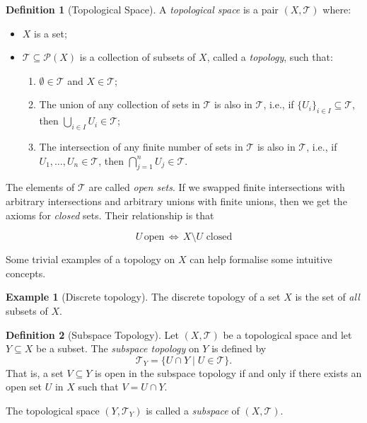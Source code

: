 \documentclass{article}
\theoremstyle{definition}
\newtheorem{definition}{Definition}[section]
\theoremstyle{definition}
\theoremstyle{definition}
\newtheorem{eg}{Example}[section]
\begin{document}
\begin{definition}[Topological Space] A \emph{topological space} is a pair \( (X, \mathcal{T}) \) where:
\begin{itemize}
    \item \( X \) is a set;
    \item \( \mathcal{T} \subseteq \mathcal{P}(X) \) is a collection of subsets of \( X \), called a \emph{topology}, such that:
    \begin{enumerate}
        \item \( \emptyset \in \mathcal{T} \) and \( X \in \mathcal{T} \);
        \item The union of any collection of sets in \( \mathcal{T} \) is also in \( \mathcal{T} \), i.e., if \( \{U_i\}_{i \in I} \subseteq \mathcal{T} \), then \( \bigcup_{i \in I} U_i \in \mathcal{T} \);
        \item The intersection of any finite number of sets in \( \mathcal{T} \) is also in \( \mathcal{T} \), i.e., if \( U_1, \dots, U_n \in \mathcal{T} \), then \( \bigcap_{j=1}^n U_j \in \mathcal{T} \).
    \end{enumerate}
\end{itemize}

The elements of \( \mathcal{T} \) are called \emph{open sets}. If we swapped finite intersections with arbitrary intersections and arbitrary unions with finite unions, then we get the axioms for \emph{closed} sets. Their relationship is that 

$$U \,\text{open}\,\iff\, X\setminus U\,\,\text{closed}$$

    
\end{definition} 

Some trivial examples of a topology on $X$ can help formalise some intuitive concepts.

\begin{eg}[Discrete topology] The discrete topology of a set $X$ is the set of \emph{all} subsets of $X$.
\end{eg}


\begin{definition}[Subspace Topology]
Let $(X, \mathcal{T})$ be a topological space and let $Y \subseteq X$ be a subset. The \emph{subspace topology} on $Y$ is defined by
\[
\mathcal{T}_Y = \{ U \cap Y \mid U \in \mathcal{T} \}.
\]
That is, a set $V \subseteq Y$ is open in the subspace topology if and only if there exists an open set $U$ in $X$ such that $V = U \cap Y$.

The topological space $(Y, \mathcal{T}_Y)$ is called a \emph{subspace} of $(X, \mathcal{T})$.
\end{definition}
\end{document}
